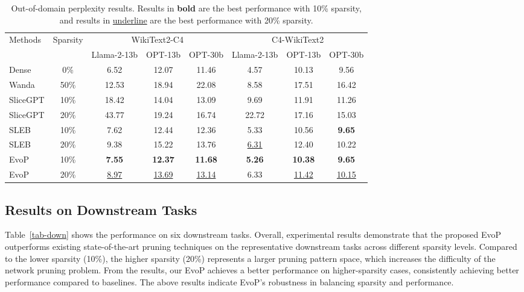 \begin{table*}[t]
\centering
\begin{tabular}{lccccccc}
\toprule
\multirow{2}{*}{Methods} & \multirow{2}{*}{Sparsity} & \multicolumn{3}{c}{WikiText2-C4} & \multicolumn{3}{c}{C4-WikiText2} \\
& & Llama-2-13b & OPT-13b & OPT-30b & Llama-2-13b & OPT-13b & OPT-30b \\
\midrule
Dense & 0\% & 6.52 & 12.07 & 11.46 & 4.57 & 10.13 & 9.56 \\
\midrule
Wanda & 50\% & 12.53 & 18.94 & 22.08 & 8.58 & 17.51 & 16.42 \\ 
SliceGPT & 10\% & 18.42 & 14.04 & 13.09 & 9.69 & 11.91 & 11.26 \\
SliceGPT & 20\% & 43.77 & 19.24 & 16.74 & 22.72 & 17.16 & 15.03 \\ 
SLEB & 10\% & 7.62 & 12.44 & 12.36 & 5.33 & 10.56 & \textbf{9.65} \\
SLEB & 20\% & 9.38 & 15.22 & 13.76 & \underline{6.31} & 12.40 & 10.22 \\
\midrule
EvoP & 10\% & \textbf{7.55} & \textbf{12.37} & \textbf{11.68} & \textbf{5.26} & \textbf{10.38} & \textbf{9.65} \\
EvoP & 20\% & \underline{8.97} & \underline{13.69} & \underline{13.14} & 6.33 & \underline{11.42} & \underline{10.15} \\
\bottomrule
\end{tabular}
\caption{Out-of-domain perplexity results. Results in \textbf{bold} are the best performance with 10\% sparsity, and results in \underline{underline} are the best performance with 20\% sparsity.}
\label{tab-ood-ppl}
\end{table*}

\subsection{Results on Downstream Tasks}

Table~\ref{tab-down} shows the performance on six downstream tasks.
Overall, experimental results demonstrate that the proposed EvoP outperforms existing state-of-the-art pruning techniques on the representative downstream tasks across different sparsity levels.
Compared to the lower sparsity (10\%), the higher sparsity (20\%) represents a larger pruning pattern space, which increases the difficulty of the network pruning problem. 
From the results, our EvoP achieves a better performance on higher-sparsity cases, consistently achieving better performance compared to baselines.
The above results indicate EvoP's robustness in balancing sparsity and performance.

